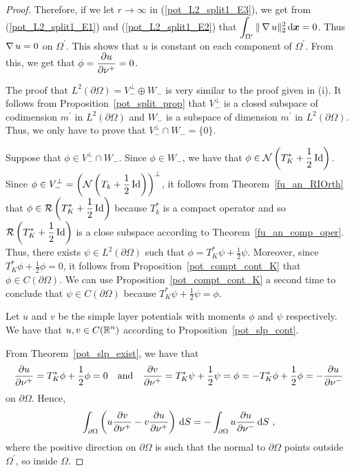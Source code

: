 \begin{proof}
Therefore, if we let $r \to \infty$ in (\ref{pot_L2_split1_E3}), we
get from (\ref{pot_L2_split1_E1}) and (\ref{pot_L2_split1_E2}) that
$\displaystyle \int_{\Omega^{\prime}} \|\operatorname{\nabla} u\|_2^2 \,\mathrm{d}{{\bm{x}}} = 0$.
Thus $\operatorname{\nabla} u = 0$ on $\displaystyle \Omega^{\prime}$.  This shows that $u$ is
constant on each component of $\displaystyle \Omega^{\prime}$.  From
this, we get that $\displaystyle \phi = \frac{\partial{u}}{\partial \nu^+} = 0$.

 The proof that
$\displaystyle L^2(\partial \Omega) = V_-^\perp \oplus W_-$ is very
similar to the proof given in (i). It
follows from Proposition~\ref{pot_split_prop} that $V_-^\perp$ is a
closed subspace of codimension $\displaystyle m^{\prime}$ in
$\displaystyle L^2(\partial \Omega)$ and $W_-$
is a subspace of dimension $\displaystyle m^{\prime}$ in
$\displaystyle L^2(\partial \Omega)$.  Thus, we
only have to prove that $\displaystyle V_-^\perp \cap W_- = \{0\}$.

Suppose that $\displaystyle \phi \in V_-^\perp \cap W_-$.
Since $\phi \in W_-$, we have that
$\displaystyle \phi \in \mathcal{N} \left(T^\ast_K + \frac{1}{2} \operatorname{Id}\right)$.
Since $\displaystyle \phi \in V_-^\perp
= \left(\mathcal{N} \left(T_k + \frac{1}{2} \operatorname{Id}\right)\right)^\perp$,
it follows from Theorem~\ref{fu_an_RIOrth} that
$\displaystyle \phi \in \mathcal{R} \left( T^\ast_K + \frac{1}{2} \operatorname{Id}\right)$ because
$\displaystyle T_k^\ast$ is a compact operator
and so $\displaystyle \mathcal{R} \left( T^\ast_K + \frac{1}{2} \operatorname{Id}\right)$
is a close subspace according to Theorem~\ref{fu_an_comp_oper}.  Thus, there
exists $\displaystyle \psi \in L^2(\partial \Omega)$ such that
$\displaystyle \phi = T^\ast_K \psi + \frac{1}{2} \psi$.  Moreover,
since $\displaystyle T^\ast_K\phi + \frac{1}{2} \phi = 0$, it follows
from Proposition~\ref{pot_compt_cont_K} that
$\phi \in C(\partial \Omega)$.  We can use 
Proposition~\ref{pot_compt_cont_K} a second time to conclude that
$\psi \in C(\partial \Omega)$ because
$\displaystyle T^\ast_K \psi + \frac{1}{2} \psi = \phi$.

Let $u$ and $v$ be the simple layer potentials with moments $\phi$ and
$\psi$ respectively.    We have that $\displaystyle u,v \in C(\mathbb{R}^n)$
according to Proposition~\ref{pot_slp_cont}.

From Theorem~\ref{pot_slp_exist}, we have that
\[
  \frac{\partial{u}}{\partial \nu^+} = T^\ast_K \phi + \frac{1}{2} \phi = 0
\quad \text{and} \quad
  \frac{\partial{v}}{\partial \nu^+} = T^\ast_K \psi + \frac{1}{2} \psi
= \phi = - T^\ast_K \phi + \frac{1}{2} \phi
= - \frac{\partial{u}}{\partial \nu^-}
\]
on $\partial \Omega$.  Hence,
\begin{equation} \label{pot_L2_split1_E4}
\int_{\partial \Omega} \left( u \frac{\partial{v}}{\partial \nu^+}
- v \frac{\partial{u}}{\partial \nu^+} \right) \,\mathrm{d}{S}
= - \int_{\partial \Omega} u \frac{\partial{u}}{\partial \nu^-} \,\mathrm{d}{S} \ ,
\end{equation}
where the positive direction on $\partial \Omega$ is such that the
normal to $\partial \Omega$ points outside
$\displaystyle \Omega^{\prime}$, so inside $\Omega$.


\end{proof}

